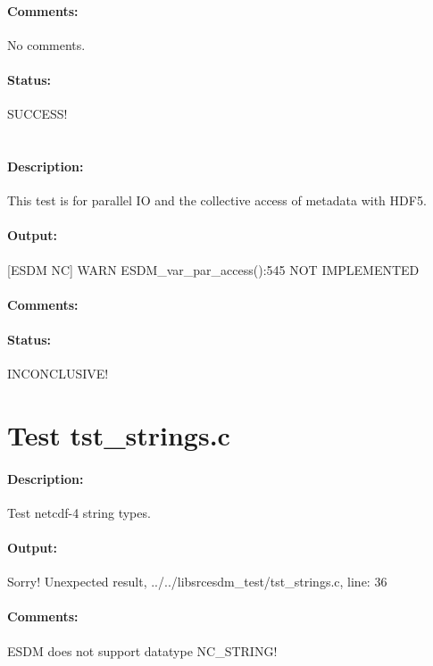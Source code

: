 \paragraph{Comments:} No comments.

\paragraph{Status:} SUCCESS!

\section{{\color{blue}{FIX ME! Test tst\_simplerw\_coll\_r.c}}}

\paragraph{Description:} This test is for parallel IO and the collective access of metadata with HDF5.

\paragraph{Output:} [ESDM NC] WARN ESDM\_var\_par\_access():545 NOT IMPLEMENTED

\paragraph{Comments:}

\paragraph{Status:} INCONCLUSIVE!

\section{Test tst\_strings.c}

\paragraph{Description:} Test netcdf-4 string types.

\paragraph{Output:} Sorry! Unexpected result, ../../libsrcesdm\_test/tst\_strings.c, line: 36

\paragraph{Comments:} ESDM does not support datatype NC\_STRING!


